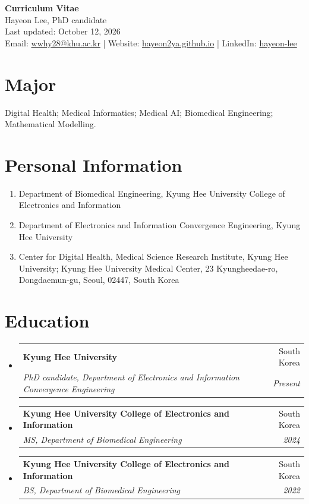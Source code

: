 \documentclass[a4paper,10pt]{article}
\makeatletter
\newcommand{\cvSubheading}[4]{
  \vspace{-1pt}\item
    \begin{tabular*}{0.98\textwidth}{l@{\extracolsep{\fill}}r}
      \textbf{#1} & #2 \\
      \textit{#3} & \textit{#4} \\
    \end{tabular*}\vspace{-5pt}
}
\makeatother
\begin{document}
\begin{center}
  {\LARGE \textbf{Curriculum Vitae}}\\
  \vspace{2pt}
  {\large Hayeon Lee, PhD candidate}\\
  \vspace{2pt}
  Last updated: October 12, 2026\\
  Email: \href{mailto:wwhy28@khu.ac.kr}{wwhy28@khu.ac.kr} \;|\;
  Website: \href{https://hayeon2ya.github.io/}{hayeon2ya.github.io} \;|\;
  LinkedIn: \href{https://www.linkedin.com/in/hayeon-lee-04bb25378/}{hayeon-lee}
\end{center}

\section{Major}
\small{
Digital Health; Medical Informatics; Medical AI; Biomedical Engineering; Mathematical Modelling.
}

\section{Personal Information}
\begin{enumerate}
  \item Department of Biomedical Engineering, Kyung Hee University College of Electronics and Information
  \item Department of Electronics and Information Convergence Engineering, Kyung Hee University
  \item Center for Digital Health, Medical Science Research Institute, Kyung Hee University; Kyung Hee University Medical Center, 23 Kyungheedae-ro, Dongdaemun-gu, Seoul, 02447, South Korea
\end{enumerate}

\section{Education}
\begin{itemize}
  \cvSubheading
    {Kyung Hee University}{South Korea}
    {PhD candidate, Department of Electronics and Information Convergence Engineering}{Present}
  \cvSubheading
    {Kyung Hee University College of Electronics and Information}{South Korea}
    {MS, Department of Biomedical Engineering}{2024}
  \cvSubheading
    {Kyung Hee University College of Electronics and Information}{South Korea}
    {BS, Department of Biomedical Engineering}{2022}
\end{itemize}
\end{document}
